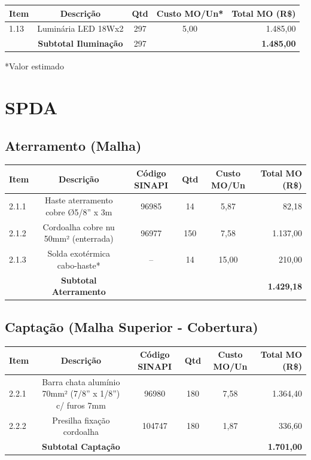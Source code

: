 \documentclass[12pt,a4paper]{article}
\renewenvironment{table}%
{\begin{center}%
\scriptsize%
\addtolength{\tabcolsep}{-2pt}%
}%
{\end{center}}
\begin{document}
\begin{table}
\centering
\begin{tabular}{lcccr}
\toprule
\textbf{Item} & \textbf{Descrição} & \textbf{Qtd} & \textbf{Custo MO/Un*} & \textbf{Total MO (R\$)} \\
\midrule
1.13 & Luminária LED 18Wx2 & 297 & 5,00 & 1.485,00 \\
\midrule
 & \textbf{Subtotal Iluminação} & 297 & & \textbf{1.485,00} \\
\bottomrule
\end{tabular}
\end{table}

\noindent\small{*Valor estimado}

\section{SPDA}

\subsection{Aterramento (Malha)}

\begin{table}
\centering
\begin{tabular}{lccccr}
\toprule
\textbf{Item} & \textbf{Descrição} & \textbf{Código SINAPI} & \textbf{Qtd} & \textbf{Custo MO/Un} & \textbf{Total MO (R\$)} \\
\midrule
2.1.1 & Haste aterramento cobre Ø5/8'' x 3m & 96985 & 14 & 5,87 & 82,18 \\
2.1.2 & Cordoalha cobre nu 50mm² (enterrada) & 96977 & 150 & 7,58 & 1.137,00 \\
2.1.3 & Solda exotérmica cabo-haste* & -- & 14 & 15,00 & 210,00 \\
\midrule
 & \textbf{Subtotal Aterramento} & & & & \textbf{1.429,18} \\
\bottomrule
\end{tabular}
\end{table}

\subsection{Captação (Malha Superior - Cobertura)}

\begin{table}
\centering
\begin{tabular}{lccccr}
\toprule
\textbf{Item} & \textbf{Descrição} & \textbf{Código SINAPI} & \textbf{Qtd} & \textbf{Custo MO/Un} & \textbf{Total MO (R\$)} \\
\midrule
2.2.1 & Barra chata alumínio 70mm² (7/8'' x 1/8'') c/ furos 7mm & 96980 & 180 & 7,58 & 1.364,40 \\
2.2.2 & Presilha fixação cordoalha & 104747 & 180 & 1,87 & 336,60 \\
\midrule
 & \textbf{Subtotal Captação} & & & & \textbf{1.701,00} \\
\bottomrule
\end{tabular}
\end{table}
\end{document}
